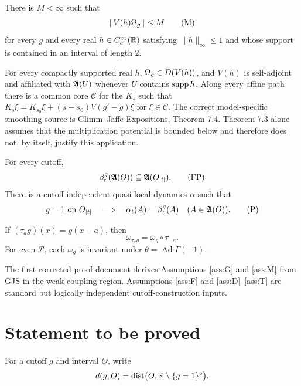 \documentclass[11pt,a4paper]{article}
\begin{document}
\begin{assumption}\label{ass:M}
There is $M<\infty$ such that
\[
 \|V(h)\Omega_g\|\leq M                                             \tag{M}
\]
for every $g$ and every real $h\in C_c^\infty(\mathbb R)$ satisfying
$\|h\|_\infty\leq1$ and whose support is contained in an interval of length $2$.
\end{assumption}

\begin{assumption}\label{ass:D}
For every compactly supported real $h$, $\Omega_g\in D(V(h))$, and $V(h)$ is
self-adjoint and affiliated with $\mathfrak A(U)$ whenever $U$ contains $\operatorname{supp} h$.
Along every affine path there is a common core $\mathscr C$ for the $K_s$ such that
$K_s\xi=K_{s_0}\xi+(s-s_0)V(g'-g)\xi$ for $\xi\in\mathscr C$.
The correct model-specific smoothing source is Glimm--Jaffe Expositions,
Theorem 7.4.  Theorem 7.3 alone assumes that the multiplication potential is
bounded below and therefore does not, by itself, justify this application.
\end{assumption}

\begin{assumption}\label{ass:P}
For every cutoff,
\[
 \beta_t^g(\mathfrak A(O))\subseteq\mathfrak A(O_{|t|}).                             \tag{FP}
\]
There is a cutoff-independent quasi-local dynamics $\alpha$ such that
\[
 g=1\text{ on }O_{|t|}\quad\Longrightarrow\quad
 \alpha_t(A)=\beta_t^g(A)\quad(A\in\mathfrak A(O)).                         \tag{P}
\]
\end{assumption}

\begin{assumption}[covariance]\label{ass:T}
If $(\tau_ag)(x)=g(x-a)$, then
\[
 \omega_{\tau_ag}=\omega_g\circ\tau_{-a}.                         \tag{T}
\]
For even $\mathscr P$, each $\omega_g$ is invariant under
$\theta=\operatorname{Ad}\Gamma(-1)$.
\end{assumption}

The first corrected proof document derives Assumptions \ref{ass:G} and \ref{ass:M}
from GJS in the weak-coupling region.  Assumptions \ref{ass:F} and
\ref{ass:D}--\ref{ass:T} are standard but logically independent
cutoff-construction inputs.

\section{Statement to be proved}

For a cutoff $g$ and interval $O$, write
\[
 d(g,O)=\operatorname{dist}\bigl(O,\mathbb R\setminus\{g=1\}^{\circ}\bigr).
\]
\end{document}
